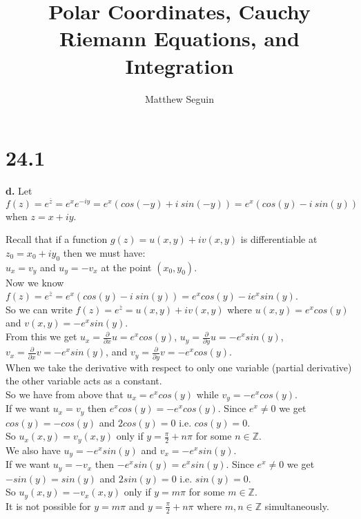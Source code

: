 \documentclass{article}
\title{Polar Coordinates, Cauchy Riemann Equations, and Integration}
\author{Matthew Seguin}
\date{}
\begin{document}
\maketitle

\section*{24.1}

{\Large\textbf{d.}} Let $f(z) = e^{\overline{z}} = e^x e^{-iy} = e^x (cos(-y) + i\:sin(-y)) = e^x (cos(y) - i\:sin(y))$ when $z = x + iy$.
\begin{center}
    \doublespacing
    Recall that if a function $g(z) = u(x, y) + iv(x, y)$ is differentiable at $z_0 = x_0 + i y_0$ then we must have:
    \\$u_x = v_y$ and $u_y = -v_x$ at the point $(x_0, y_0)$.
    \\Now we know $f(z) = e^{\overline{z}} = e^x (cos(y) - i\:sin(y)) = e^x cos(y) - ie^x sin(y)$.
    \\So we can write $f(z) = e^{\overline{z}} = u(x, y) + iv(x, y)$ where $u(x, y) = e^x cos(y)$ and $v(x, y) = -e^x sin(y)$.
    \\From this we get $u_x =\frac{\partial}{\partial x} u = e^x cos(y)$, $u_y =\frac{\partial}{\partial y} u = -e^x sin(y)$, $v_x =\frac{\partial}{\partial x} v = -e^x sin(y)$, and $v_y =\frac{\partial}{\partial y} v = -e^x cos(y)$.
    \\When we take the derivative with respect to only one variable (partial derivative) the other variable acts as a constant.
    \break
    \\So we have from above that $u_x = e^x cos(y)$ while $v_y = -e^x cos(y)$.
    \\If we want $u_x = v_y$ then $e^x cos(y) = - e^x cos(y)$. Since $e^x\neq 0$ we get $cos(y) = - cos(y)$ and $2 cos(y) = 0$ i.e. $cos(y) = 0$. \\So $u_x(x, y) = v_y(x, y)$ only if $y =\frac{\pi}{2} + n\pi$ for some $n\in\mathbb{Z}$.
    \break
    \\We also have $u_y = - e^x sin(y)$ and $v_x = - e^x sin(y)$.
    \\If we want $u_y = -v_x$ then $- e^x sin(y) = e^x sin(y)$. Since $e^x\neq 0$ we get $- sin(y) = sin(y)$ and $2 sin(y) = 0$ i.e. $sin(y) = 0$. \\So $u_y(x, y) = - v_x(x, y)$ only if $y = m\pi$ for some $m\in\mathbb{Z}$.
    \break
    \\It is not possible for $y = m\pi$ and $y =\frac{\pi}{2} + n\pi$ where $m, n\in\mathbb{Z}$ simultaneously.

\end{center}
\end{document}
